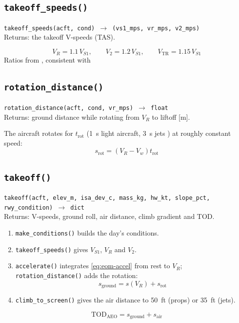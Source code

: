 \documentclass[11pt,letterpaper]{article}
\numberwithin{equation}{section}
\newcommand{\func}[2]{\begin{funcbox}\texttt{#1}\\[2pt]{\color{ink3}Returns:} #2\end{funcbox}}
\newcommand{\code}[1]{\textmd{\texttt{#1}}}
\begin{document}
\subsection{\code{takeoff\_speeds()}}
\func{takeoff\_speeds(acft, cond) $\rightarrow$ (vs1\_mps, vr\_mps, v2\_mps)}{the takeoff V-speeds (TAS).}
\begin{equation}
V_R = 1.1\,V_{S1}, \qquad V_2 = 1.2\,V_{S1}, \qquad V_\text{TR} = 1.15\,V_{S1} \label{eq:vspeeds}
\end{equation}
Ratios from \cite[Ch.~17]{RAYMER}, consistent with \cite[\S25.107.]{14CFR25}

\subsection{\code{rotation\_distance()}}
\func{rotation\_distance(acft, cond, vr\_mps) $\rightarrow$ float}{ground distance while rotating from $V_R$ to liftoff [m].}
The aircraft rotates for $t_\text{rot}$ (\SI{1}{s} light aircraft, \SI{3}{s} jets \cite{RAYMER}) at roughly constant speed:
\begin{equation}
s_\text{rot} = \left(V_R - V_w\right)t_\text{rot} \label{eq:s-rot}
\end{equation}

\subsection{\code{takeoff()}}
\func{takeoff(acft, elev\_m, isa\_dev\_c, mass\_kg, hw\_kt, slope\_pct, rwy\_condition) $\rightarrow$ dict}{V-speeds, ground roll, air distance, climb gradient and TOD.}
\begin{enumerate}
\item \code{make\_conditions()} builds the day's conditions.
\item \code{takeoff\_speeds()} gives $V_{S1}$, $V_R$ and $V_2$.
\item \code{accelerate()} integrates \eqref{eq:eom-accel} from rest to $V_R$; \code{rotation\_distance()} adds the rotation:
\begin{equation}
s_\text{ground} = s(V_R) + s_\text{rot} \label{eq:s-ground}
\end{equation}
\item \code{climb\_to\_screen()} gives the air distance to \SI{50}{ft} (props) or \SI{35}{ft} (jets).
\end{enumerate}
\begin{equation}
\text{TOD}_\text{AEO} = s_\text{ground} + s_\text{air} \label{eq:tod}
\end{equation}
\end{document}
